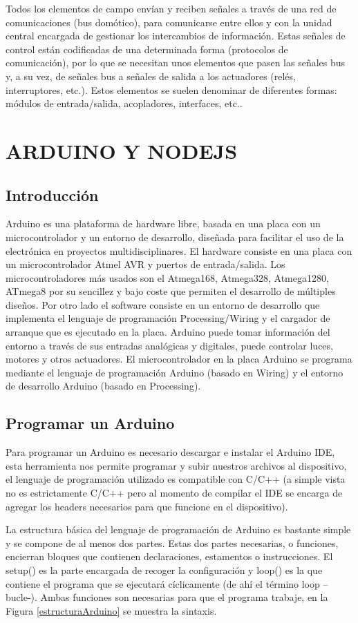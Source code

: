 \documentclass[11pt,letterpaper]{report}
\begin{document}
Todos los elementos de campo envían y reciben señales a través de una red de comunicaciones (bus domótico), para comunicarse entre ellos y con la unidad central encargada de gestionar los intercambios de información. Estas señales de control están codificadas de una determinada forma (protocolos de comunicación), por lo que se necesitan unos elementos que pasen las señales bus y, a su vez, de señales bus a señales de salida a los actuadores (relés, interruptores, etc.). Estos elementos se suelen denominar de diferentes formas: módulos de entrada/salida, acopladores, interfaces, etc.\citep{moya2004}.
\chapter{ARDUINO Y NODEJS}	
	\section{Introducción}
	Arduino es una plataforma de hardware libre, basada en una placa con un microcontrolador y un entorno de desarrollo, diseñada para facilitar el uso de la electrónica en proyectos multidisciplinares.
El hardware consiste en una placa con un microcontrolador Atmel AVR y puertos de entrada/salida. Los microcontroladores más usados son el Atmega168, Atmega328, Atmega1280, ATmega8 por su sencillez y bajo coste que permiten el desarrollo de múltiples diseños. Por otro lado el software consiste en un entorno de desarrollo que implementa el lenguaje de programación Processing/Wiring y el cargador de arranque que es ejecutado en la placa.
Arduino puede tomar información del entorno a través de sus entradas analógicas y digitales, puede controlar luces, motores y otros actuadores. El microcontrolador en la placa Arduino se programa mediante el lenguaje de programación Arduino (basado en Wiring) y el entorno de desarrollo Arduino (basado en Processing)\citep{mcroberts2011arduino}.
	\section{Programar un Arduino}
	Para programar un Arduino es necesario descargar e instalar el Arduino IDE, esta herramienta nos permite programar y subir nuestros archivos al dispositivo, el lenguaje de programación utilizado es compatible con C/C++ (a simple vista no es estrictamente C/C++ pero al momento de compilar el IDE se encarga de agregar los headers necesarios para que funcione en el dispositivo).
	
La estructura básica del lenguaje de programación de Arduino es bastante simple y se compone de al menos dos partes. Estas dos partes necesarias, o funciones, encierran bloques que contienen declaraciones, estamentos o instrucciones.
El setup() es la parte encargada de recoger la configuración y loop() es la que contiene el programa que se ejecutará cíclicamente (de ahí el término loop –bucle-). Ambas funciones son necesarias para que el programa trabaje, en la Figura \ref{estructuraArduino} se muestra la sintaxis.
\end{document}
